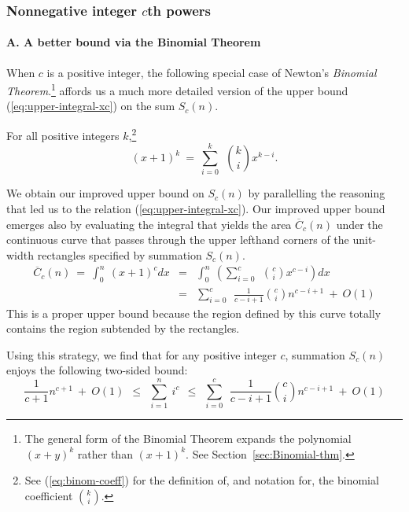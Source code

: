 \subsubsection{Nonnegative integer $c$th powers}
\label{sec:positive-integer-power}

\paragraph{\small\sf A. A better bound via the Binomial Theorem}

When $c$ is a positive integer, the following special case of Newton's
{\it Binomial Theorem}.\footnote{The general form of the Binomial
  Theorem expands the polynomial $(x+y)^k$ rather than $(x+1)^k$.  See
Section~\ref{sec:Binomial-thm}.}
affords us a much more detailed version of the upper bound
(\ref{eq:upper-integral-xc})
on the sum $S_c(n)$.

\begin{theorem}
\label{thm:restricted-binomial-thm}
For all positive integers $k$,\footnote{See (\ref{eq:binom-coeff}) for
  the definition of, and notation for, the binomial coefficient
  $\displaystyle {k \choose i}$.}
\[ (x+1)^k \ = \
\sum_{i=0}^k \ \ {k \choose i} x^{k-i}.
\]
\end{theorem}

We obtain our improved upper bound on $S_c(n)$ by parallelling the
reasoning that led us to the relation (\ref{eq:upper-integral-xc}).
Our improved upper bound emerges also by evaluating the integral that
yields the area $\overline{C}_c(n)$ under the continuous curve that
passes through the upper lefthand corners of the unit-width rectangles
specified by summation $S_c(n)$.
\begin{eqnarray}
\label{eq:upper-integral-xk}
\overline{C}_c(n) \ = \
\int_0^n \ (x+1)^c dx & = &
\int_0^n \ \left(
\sum_{i=0}^c \ \ {c \choose i} x^{c-i} \right) dx \\
\nonumber
  & = &
\sum_{i=0}^c \ \ \frac{1}{c-i+1} {c \choose i} n^{c-i+1} \ + \ O(1)
\end{eqnarray}
This is a proper upper bound because the region defined by this curve
totally contains the region subtended by the rectangles.

\noindent
Using this strategy, we find that for any positive integer $c$,
summation $S_c(n)$ enjoys the following two-sided bound:
\begin{equation}
\label{eq:bounds-sum-xk}
\frac{1}{c+1} n^{c+1} \ + \ O(1)
  \ \ \leq \ \ \sum_{i=1}^n \ i^c
  \ \ \leq \ \ 
\sum_{i=0}^c \ \ \frac{1}{c-i+1} {c \choose i} n^{c-i+1} \ + \ O(1)
\end{equation}

